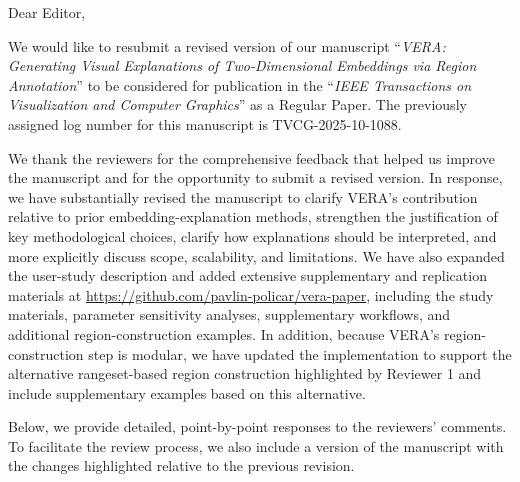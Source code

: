 \documentclass[11pt]{article}
\begin{document}
\onehalfspacing %
\setlength{\parskip}{3mm} %


\vspace{2mm}

\vspace{2mm}


\noindent Dear Editor,\\
 
\vspace{3mm}

\noindent We would like to resubmit a revised version of our manuscript ``\textit{VERA: Generating Visual Explanations of Two-Dimensional Embeddings via Region Annotation}'' to be considered for publication in the ``\textit{IEEE Transactions on Visualization and Computer Graphics}'' as a Regular Paper. The previously assigned log number for this manuscript is TVCG-2025-10-1088.

We thank the reviewers for the comprehensive feedback that helped us improve the manuscript and for the opportunity to submit a revised version. In response, we have substantially revised the manuscript to clarify VERA's contribution relative to prior embedding-explanation methods, strengthen the justification of key methodological choices, clarify how explanations should be interpreted, and more explicitly discuss scope, scalability, and limitations. We have also expanded the user-study description and added extensive supplementary and replication materials at \url{https://github.com/pavlin-policar/vera-paper}, including the study materials, parameter sensitivity analyses, supplementary workflows, and additional region-construction examples. In addition, because VERA's region-construction step is modular, we have updated the implementation to support the alternative rangeset-based region construction highlighted by Reviewer 1 and include supplementary examples based on this alternative.

Below, we provide detailed, point-by-point responses to the reviewers' comments. To facilitate the review process, we also include a version of the manuscript with the changes highlighted relative to the previous revision.

\vspace{3mm}
\end{document}
